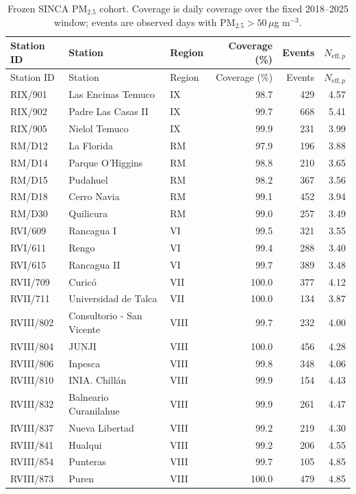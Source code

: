 \documentclass[11pt]{article}
\begin{document}
\small
\begin{longtable}{lllrrr}
\caption{Frozen SINCA PM$_{2.5}$ cohort. Coverage is daily coverage over the fixed 2018--2025 window; events are observed days with PM$_{2.5}>50\,\mu$g m$^{-3}$.}\label{tab:sincacohort}\\
\toprule
Station ID & Station & Region & Coverage (\%) & Events & $N_{\mathrm{eff},p}$\\
\midrule
\endfirsthead
\toprule
Station ID & Station & Region & Coverage (\%) & Events & $N_{\mathrm{eff},p}$\\
\midrule
\endhead
RIX/901 & Las Encinas Temuco & IX & 98.7 & 429 & 4.57 \\
RIX/902 & Padre Las Casas II & IX & 99.7 & 668 & 5.41 \\
RIX/905 & Nielol Temuco & IX & 99.9 & 231 & 3.99 \\
RM/D12 & La Florida & RM & 97.9 & 196 & 3.88 \\
RM/D14 & Parque O'Higgins & RM & 98.8 & 210 & 3.65 \\
RM/D15 & Pudahuel & RM & 98.2 & 367 & 3.56 \\
RM/D18 & Cerro Navia & RM & 99.1 & 452 & 3.94 \\
RM/D30 & Quilicura & RM & 99.0 & 257 & 3.49 \\
RVI/609 & Rancagua I & VI & 99.5 & 321 & 3.55 \\
RVI/611 & Rengo & VI & 99.4 & 288 & 3.40 \\
RVI/615 & Rancagua II & VI & 99.7 & 389 & 3.48 \\
RVII/709 & Curicó & VII & 100.0 & 377 & 4.12 \\
RVII/711 & Universidad de Talca & VII & 100.0 & 134 & 3.87 \\
RVIII/802 & Consultorio - San Vicente & VIII & 99.7 & 232 & 4.00 \\
RVIII/804 & JUNJI & VIII & 100.0 & 456 & 4.28 \\
RVIII/806 & Inpesca & VIII & 99.8 & 348 & 4.06 \\
RVIII/810 & INIA. Chillán & VIII & 99.9 & 154 & 4.43 \\
RVIII/832 & Balneario Curanilahue & VIII & 99.9 & 261 & 4.47 \\
RVIII/837 & Nueva Libertad & VIII & 99.2 & 219 & 4.30 \\
RVIII/841 & Hualqui & VIII & 99.2 & 206 & 4.55 \\
RVIII/854 & Punteras & VIII & 99.7 & 105 & 4.85 \\
RVIII/873 & Puren & VIII & 100.0 & 479 & 4.85 \\

\end{longtable}
\end{document}
